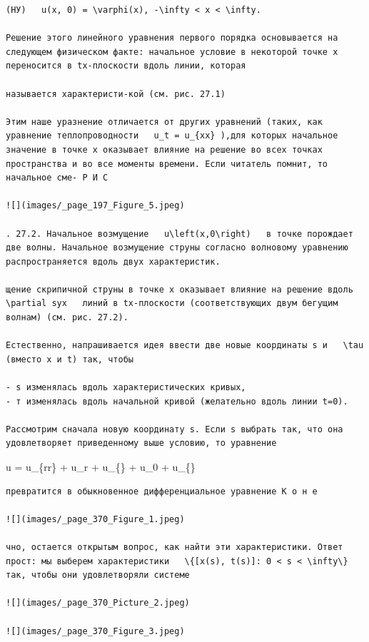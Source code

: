 \documentclass[
  ukrainian,
]{article}
\begin{document}
\begin{verbatim}
(НУ)   u(x, 0) = \varphi(x), -\infty < x < \infty.  

Решение этого линейного уравнения первого порядка основывается на следующем физическом факте: начальное условие в некоторой точке x переносится в tx-плоскости вдоль линии, которая

называется характеристи-кой (см. рис. 27.1)

Этим наше уразнение отличается от других уравнений (таких, как уравнение теплопроводности   u_t = u_{xx} ),для которых начальное значение в точке x оказывает влияние на решение во всех точках пространства и во все моменты времени. Если читатель помнит, то начальное сме- Р И С

![](images/_page_197_Figure_5.jpeg)

. 27.2. Начальное возмущение   u\left(x,0\right)   в точке порождает две волны. Начальное возмущение струны согласно волновому уравнению распространяется вдоль двух характеристик.

щение скрипичной струны в точке x оказывает влияние на решение вдоль   \partial syx   линий в tx-плоскости (соответствующих двум бегущим волнам) (см. рис. 27.2).

Естественно, напрашивается идея ввести две новые координаты s и   \tau   (вместо x и t) так, чтобы

- s изменялась вдоль характеристических кривых,
- т изменялась вдоль начальной кривой (желательно вдоль линии t=0).

Рассмотрим сначала новую координату s. Если s выбрать так, что она удовлетворяет приведенному выше условию, то уравнение
\end{verbatim}

\Delta u = u\_\{rr\} + u\_r +
u\_\{\theta\theta\} + u\_0 +
u\_\{\phi\phi\}

\begin{verbatim}
превратится в обыкновенное дифференциальное уравнение К о н е

![](images/_page_370_Figure_1.jpeg)

чно, остается открытым вопрос, как найти эти характеристики. Ответ прост: мы выберем характеристики   \{[x(s), t(s)]: 0 < s < \infty\}   так, чтобы они удовлетворяли системе

![](images/_page_370_Picture_2.jpeg)

![](images/_page_370_Figure_3.jpeg)
\end{verbatim}
\end{document}

